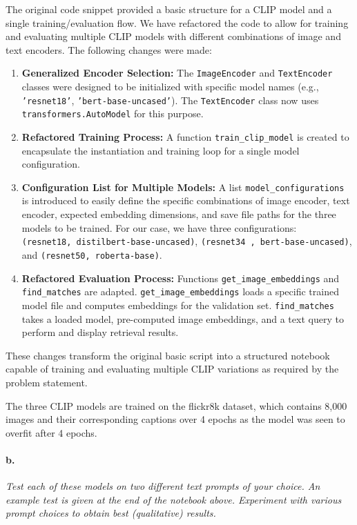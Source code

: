 \documentclass{article}
\begin{document}
The original code snippet provided a basic structure for a CLIP model and a single training/evaluation flow. We have refactored the code to allow for training and evaluating multiple CLIP models with different combinations of image and text encoders. The following changes were made:

\begin{enumerate}
    \item \textbf{Generalized Encoder Selection:} The \texttt{ImageEncoder} and \texttt{TextEncoder} classes were designed to be initialized with specific model names (e.g., \texttt{'resnet18'}, \texttt{'bert-base-uncased'}). The \texttt{TextEncoder} class now uses \texttt{transformers.AutoModel} for this purpose.
    \item \textbf{Refactored Training Process:} A function \texttt{train\_clip\_model} is created to encapsulate the instantiation and training loop for a single model configuration.
    \item \textbf{Configuration List for Multiple Models:} A list \texttt{model\_configurations} is introduced to easily define the specific combinations of image encoder, text encoder, expected embedding dimensions, and save file paths for the three models to be trained. For our case, we have three configurations: \texttt{   (resnet18, distilbert-base-uncased)}, \texttt{(resnet34 , bert-base-uncased)}, and \texttt{(resnet50, roberta-base)}.
    \item \textbf{Refactored Evaluation Process:} Functions \texttt{get\_image\_embeddings} and \texttt{find\_matches} are adapted. \texttt{get\_image\_embeddings} loads a specific trained model file and computes embeddings for the validation set. \texttt{find\_matches} takes a loaded model, pre-computed image embeddings, and a text query to perform and display retrieval results.
\end{enumerate}

These changes transform the original basic script into a structured notebook capable of training and evaluating multiple CLIP variations as required by the problem statement.

The three CLIP models are trained on the flickr8k dataset, which contains 8,000 images and their corresponding captions over 4 epochs as the model was seen to overfit after 4 epochs. 

\paragraph{b.} \textit{Test each of these models on two different text prompts of your choice. An example test is given at the end of the notebook above. Experiment with various prompt choices to obtain best (qualitative) results.}
\end{document}
